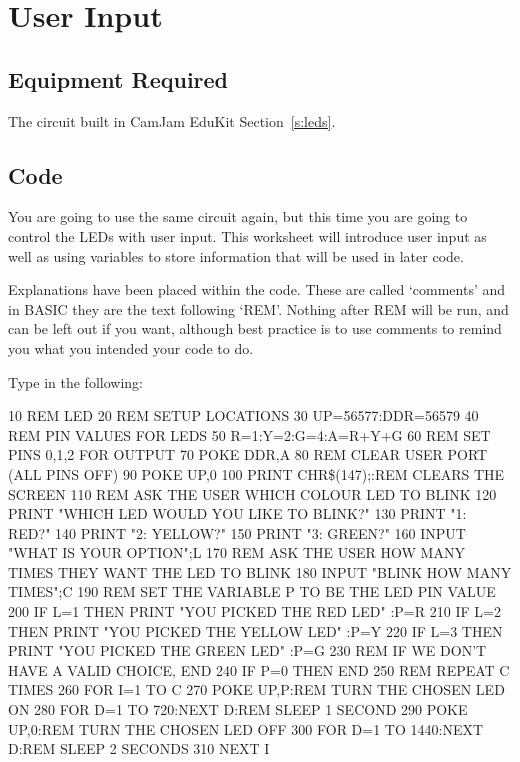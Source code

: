 \section{User Input}


\subsection*{Equipment Required}

The circuit built in CamJam EduKit Section~\ref{s:leds}.

\subsection*{Code}

You are going to use the same circuit again, but this time you are going to control the LEDs with user input.  This worksheet will introduce user input as well as using variables to store information that will be used in later code.

Explanations have been placed within the code.  These are called `comments' and in BASIC they are the text following `REM'.  Nothing after REM will be run, and can be left out if you want, although best practice is to use comments to remind you what you intended your code to do.

Type in the following:
\begin{basic}
10 REM LED
20 REM SETUP LOCATIONS
30 UP=56577:DDR=56579
40 REM PIN VALUES FOR LEDS
50 R=1:Y=2:G=4:A=R+Y+G
60 REM SET PINS 0,1,2 FOR OUTPUT
70 POKE DDR,A
80 REM CLEAR USER PORT (ALL PINS OFF)
90 POKE UP,0
100 PRINT CHR\$(147);:REM CLEARS THE SCREEN
110 REM ASK THE USER WHICH COLOUR LED TO BLINK
120 PRINT "WHICH LED WOULD YOU LIKE TO BLINK?"
130 PRINT "1: RED?"
140 PRINT "2: YELLOW?"
150 PRINT "3: GREEN?"
160 INPUT "WHAT IS YOUR OPTION";L
170 REM ASK THE USER HOW MANY TIMES THEY WANT THE
    LED TO BLINK
180 INPUT "BLINK HOW MANY TIMES";C
190 REM SET THE VARIABLE P TO BE THE LED PIN
    VALUE
200 IF L=1 THEN PRINT "YOU PICKED THE RED LED"
    :P=R
210 IF L=2 THEN PRINT "YOU PICKED THE YELLOW LED"
    :P=Y
220 IF L=3 THEN PRINT "YOU PICKED THE GREEN LED"
    :P=G
230 REM IF WE DON'T HAVE A VALID CHOICE, END
240 IF P=0 THEN END
250 REM REPEAT C TIMES
260 FOR I=1 TO C
270 POKE UP,P:REM TURN THE CHOSEN LED ON
280 FOR D=1 TO 720:NEXT D:REM SLEEP 1 SECOND
290 POKE UP,0:REM TURN THE CHOSEN LED OFF
300 FOR D=1 TO 1440:NEXT D:REM SLEEP 2 SECONDS
310 NEXT I
\end{basic}

